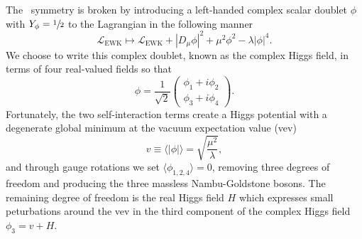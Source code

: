 The \sutwo\ symmetry is broken by introducing a left-handed complex scalar doublet $\phi$ with $Y_\phi = \sfrac{1}{2}$ to the Lagrangian in the following manner
\begin{equation}
  \label{eqn:ewsb}
  \mathcal{L}_{\text{EWK}} \mapsto \mathcal{L}_{\text{EWK}} + \left|D_\mu \phi \right|^2 + \mu^2 \phi^2 - \lambda \left| \phi \right|^4 .
\end{equation}
We choose to write this complex doublet, known as the complex Higgs field, in terms of four real-valued fields so that
\begin{equation}
  \phi = \frac{1}{\sqrt{2}} \begin{pmatrix} \phi_1 + i \phi_2 \\ \phi_3 + i\phi_4 \end{pmatrix} .
\end{equation}
Fortunately, the two self-interaction terms create a Higgs potential with a degenerate global minimum at the vacuum expectation value (vev)
\begin{equation}
  v \equiv \langle | \phi | \rangle = \sqrt{ \frac{\mu^2}{\lambda}},
\end{equation}
and through gauge rotations we set $\langle \phi_{1,2,4} \rangle = 0$, removing three degrees of freedom and producing the three massless Nambu-Goldstone bosons.
The remaining degree of freedom is the real Higgs field $H$ which expresses small peturbations around the vev in the third component of the complex Higgs field $\phi_3 = v + H$.

